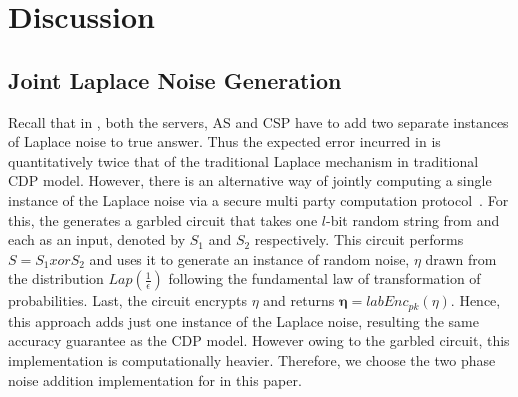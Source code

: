 \section{Discussion}
\subsection{Joint Laplace Noise Generation}\label{jointLap}
Recall that in \system,  both the servers, \textsf{AS} and \textsf{CSP} have to add two separate instances of Laplace noise to true answer. Thus the expected error incurred in \system is quantitatively twice that of the traditional Laplace mechanism in traditional \textsf{CDP} model. However, there is an alternative way of jointly computing a single instance of the Laplace noise via a secure multi party computation protocol~\cite{Djoin}. For this, the \CPS generates a garbled circuit that takes one $l$-bit random string from \CPS and \AS each as an input, denoted by $S_1$ and $S_2$ respectively. This circuit performs$S=S_1 xor S_2$  and uses it to generate an instance of random noise, $\eta$ drawn from the distribution $Lap(\frac{1}{\epsilon})$ following the fundamental law of transformation of probabilities.
Last, the circuit encrypts $\eta$ and returns $\boldsymbol{\eta}=labEnc_{pk}(\eta)$.
Hence, this approach adds just one instance of the Laplace noise, resulting the same accuracy guarantee as the \textsf{CDP} model. However owing to the garbled circuit, this implementation is computationally heavier. Therefore, we choose the two phase noise addition implementation for \system in this paper.



